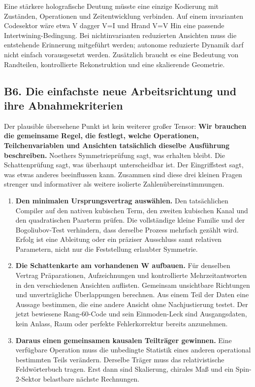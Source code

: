 Eine stärkere holografische Deutung müsste eine einzige Kodierung mit
Zuständen, Operationen und Zeitentwicklung verbinden. Auf einem
invarianten Codesektor wäre etwa V dagger V=I und Hrand V=V Hin eine
passende Intertwining-Bedingung. Bei nichtinvarianten reduzierten
Ansichten muss die entstehende Erinnerung mitgeführt werden; autonome
reduzierte Dynamik darf nicht einfach vorausgesetzt werden. Zusätzlich
braucht es eine Bedeutung von Randteilen, kontrollierte Rekonstruktion
und eine skalierende Geometrie.

\subsection{B6. Die einfachste neue Arbeitsrichtung und ihre
Abnahmekriterien}\label{b6.-die-einfachste-neue-arbeitsrichtung-und-ihre-abnahmekriterien}

Der plausible übersehene Punkt ist kein weiterer großer Tensor:
\textbf{Wir brauchen die gemeinsame Regel, die festlegt, welche
Operationen, Teilchenvariablen und Ansichten tatsächlich dieselbe
Ausführung beschreiben.} Noethers Symmetrieprüfung sagt, was erhalten
bleibt. Die Schattenprüfung sagt, was überhaupt unterscheidbar ist. Der
Eingriffstest sagt, was etwas anderes beeinflussen kann. Zusammen sind
diese drei kleinen Fragen strenger und informativer als weitere
isolierte Zahlenübereinstimmungen.

\begin{enumerate}
\def\labelenumi{\arabic{enumi}.}
\tightlist
\item
  \textbf{Den minimalen Ursprungsvertrag auswählen.} Den tatsächlichen
  Compiler auf den nativen kubischen Term, den zweiten kubischen Kanal
  und den quadratischen Paarterm prüfen. Die vollständige kleine Familie
  und der Bogoliubov-Test verhindern, dass derselbe Prozess mehrfach
  gezählt wird. Erfolg ist eine Ableitung oder ein präziser Ausschluss
  samt relativen Parametern, nicht nur die Feststellung erlaubter
  Symmetrie.
\item
  \textbf{Die Schattenkarte am vorhandenen W aufbauen.} Für denselben
  Vertrag Präparationen, Aufzeichnungen und kontrollierte
  Mehrzeitantworten in den verschiedenen Ansichten auflisten. Gemeinsam
  unsichtbare Richtungen und unverträgliche Überlappungen berechnen. Aus
  einem Teil der Daten eine Aussage bestimmen, die eine andere Ansicht
  ohne Nachjustierung testet. Der jetzt bewiesene Rang-60-Code und sein
  Einmoden-Leck sind Ausgangsdaten, kein Anlass, Raum oder perfekte
  Fehlerkorrektur bereits anzunehmen.
\item
  \textbf{Daraus einen gemeinsamen kausalen Teilträger gewinnen.} Eine
  verfügbare Operation muss die unbedingte Statistik eines anderen
  operational bestimmten Teils verändern. Derselbe Träger muss das
  relativistische Feldwörterbuch tragen. Erst dann sind Skalierung,
  chirales Maß und ein Spin-2-Sektor belastbare nächste Rechnungen.
\end{enumerate}

